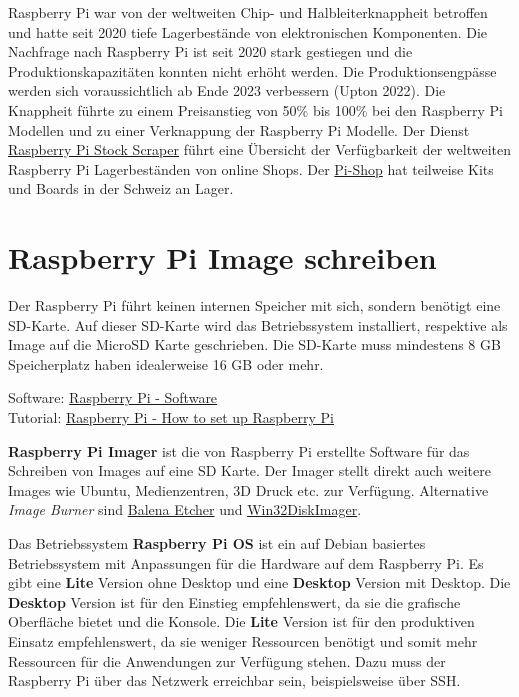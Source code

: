 \documentclass[
  11pt,
  a4paper,
  oneside, openany  ,captions=tableheading
]{scrbook}
\theoremstyle{remark}
\begin{document}
Raspberry Pi war von der weltweiten Chip- und Halbleiterknappheit
betroffen und hatte seit 2020 tiefe Lagerbestände von elektronischen
Komponenten. Die Nachfrage nach Raspberry Pi ist seit 2020 stark
gestiegen und die Produktionskapazitäten konnten nicht erhöht werden.
Die Produktionsengpässe werden sich voraussichtlich ab Ende 2023
verbessern (Upton 2022). Die Knappheit führte zu einem Preisanstieg von
50\% bis 100\% bei den Raspberry Pi Modellen und zu einer Verknappung
der Raspberry Pi Modelle. Der Dienst
\href{https://rpilocator.com/?country=CH}{Raspberry Pi Stock Scraper}
führt eine Übersicht der Verfügbarkeit der weltweiten Raspberry Pi
Lagerbeständen von online Shops. Der
\href{https://www.pi-shop.ch/bundles-kits}{Pi-Shop} hat teilweise Kits
und Boards in der Schweiz an Lager.

\section{Raspberry Pi Image
schreiben}\label{raspberry-pi-image-schreiben}

Der Raspberry Pi führt keinen internen Speicher mit sich, sondern
benötigt eine SD-Karte. Auf dieser SD-Karte wird das Betriebssystem
installiert, respektive als Image auf die MicroSD Karte geschrieben. Die
SD-Karte muss mindestens 8 GB Speicherplatz haben idealerweise 16 GB
oder mehr.

Software: \href{https://www.raspberrypi.com/software}{Raspberry Pi -
Software}\\
Tutorial:
\href{https://www.raspberrypi.com/tutorials/how-to-set-up-raspberry-pi}{Raspberry
Pi - How to set up Raspberry Pi}

\textbf{Raspberry Pi Imager} ist die von
Raspberry Pi erstellte Software für das Schreiben von Images auf eine SD
Karte. Der Imager stellt direkt auch weitere Images wie Ubuntu,
Medienzentren, 3D Druck etc. zur Verfügung. Alternative \emph{Image
Burner} sind \href{https://www.balena.io/etcher}{Balena Etcher} und
\href{https://sourceforge.net/projects/win32diskimager/}{Win32DiskImager}.

Das Betriebssystem \textbf{Raspberry Pi OS} ist
ein auf Debian basiertes Betriebssystem mit Anpassungen für die Hardware
auf dem Raspberry Pi. Es gibt eine \textbf{Lite} Version ohne Desktop
und eine \textbf{Desktop} Version mit Desktop. Die \textbf{Desktop}
Version ist für den Einstieg empfehlenswert, da sie die grafische
Oberfläche bietet und die Konsole. Die \textbf{Lite} Version ist für den
produktiven Einsatz empfehlenswert, da sie weniger Ressourcen benötigt
und somit mehr Ressourcen für die Anwendungen zur Verfügung stehen. Dazu
muss der Raspberry Pi über das Netzwerk erreichbar sein, beispielsweise
über SSH.
\end{document}
